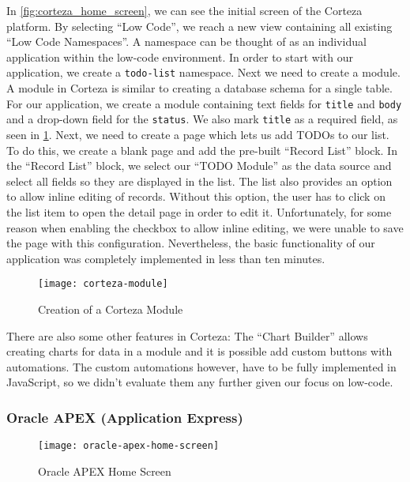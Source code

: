 \documentclass[runningheads]{llncs}
\begin{document}
In \cref{fig:corteza_home_screen}, we can see the initial screen of the Corteza platform. By selecting “Low Code”, we reach a new view containing all existing “Low Code Namespaces”. A namespace can be thought of as an individual application within the low-code environment. In order to start with our application, we create a \texttt{todo-list} namespace. Next we need to create a module. A module in Corteza is similar to creating a database schema for a single table. For our application, we create a module containing text fields for \texttt{title} and \texttt{body} and a drop-down field for the \texttt{status}. We also mark \texttt{title} as a required field, as seen in \cref{fig:corteza_module}. Next, we need to create a page which lets us add TODOs to our list. To do this, we create a blank page and add the pre-built “Record List” block. In the “Record List” block, we select our “TODO Module” as the data source and select all fields so they are displayed in the list. The list also provides an option to allow inline editing of records. Without this option, the user has to click on the list item to open the detail page in order to edit it. Unfortunately, for some reason when enabling the checkbox to allow inline editing, we were unable to save the page with this configuration. Nevertheless, the basic functionality of our application was completely implemented in less than ten minutes.

\begin{figure}
  \centering
  \texttt{[image: corteza-module]}
  \caption{Creation of a Corteza Module}
  \label{fig:corteza_module}
\end{figure}

There are also some other features in Corteza: The “Chart Builder” allows creating charts for data in a module and it is possible add custom buttons with automations. The custom automations however, have to be fully implemented in JavaScript, so we didn't evaluate them any further given our focus on low-code.

\subsubsection{Oracle APEX (Application Express)}

\begin{figure}
  \centering
  \texttt{[image: oracle-apex-home-screen]}
  \caption{Oracle APEX Home Screen}
  \label{fig:oracle_apex_home_screen}
\end{figure}
\end{document}
